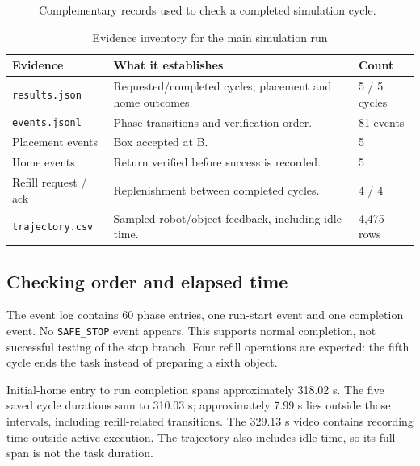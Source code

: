\documentclass[11pt,a4paper]{article}
\newcommand{\code}[1]{{\small\nolinkurl{#1}}}
\begin{document}
\begin{figure}[H]
\centering
{}
\caption{Complementary records used to check a completed simulation cycle.}
\end{figure}

\begin{table}[H]
\centering\small
\caption{Evidence inventory for the main simulation run}
\begin{tabularx}{\textwidth}{@{}p{33mm}Yp{25mm}@{}}
\toprule
Evidence & What it establishes & Count\\\midrule
\code{results.json} & Requested/completed cycles; placement and home outcomes. & 5 / 5 cycles\\
\code{events.jsonl} & Phase transitions and verification order. & 81 events\\
Placement events & Box accepted at B. & 5\\
Home events & Return verified before success is recorded. & 5\\
Refill request / ack & Replenishment between completed cycles. & 4 / 4\\
\code{trajectory.csv} & Sampled robot/object feedback, including idle time. & 4,475 rows\\
\bottomrule
\end{tabularx}
\end{table}

\subsection{Checking order and elapsed time}
The event log contains 60 phase entries, one run-start event and one completion
event. No \code{SAFE_STOP} event appears. This supports normal completion, not
successful testing of the stop branch. Four refill operations are expected:
the fifth cycle ends the task instead of preparing a sixth object.

Initial-home entry to run completion spans approximately 318.02 s. The five
saved cycle durations sum to 310.03 s; approximately 7.99 s lies outside those
intervals, including refill-related transitions. The 329.13 s video contains
recording time outside active execution. The trajectory also includes idle
time, so its full span is not the task duration.
\end{document}
